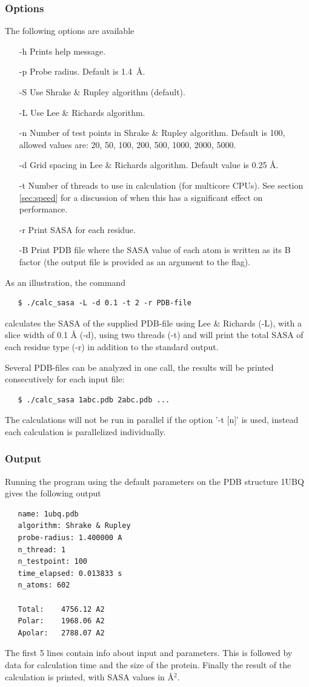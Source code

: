 \documentclass[a4paper,11pt]{article}
\begin{document}
\subsubsection{Options}
The following options are available
\begin{itemize}
  \item[-h] Prints help message.
  \item[-p] Probe radius. Default is 1.4~\AA.
  \item[-S] Use Shrake \& Rupley algorithm (default).
  \item[-L] Use Lee \& Richards algorithm.
  \item[-n] Number of test points in Shrake \& Rupley algorithm.
    Default is 100, allowed values are: 20, 50, 100, 200, 500, 1000,
    2000, 5000.
  \item[-d] Grid spacing in Lee \& Richards algorithm.
  Default value is 0.25 Å.
  \item[-t] Number of threads to use in calculation (for multicore
    CPUs). See section \ref{sec:speed} for a discussion of when this
    has a significant effect on performance.
  \item[-r] Print SASA for each residue.
  \item[-B] Print PDB file where the SASA value of each atom is
    written as its B factor (the output file is provided as an
    argument to the flag).
\end{itemize}
As an illustration, the command
\begin{verbatim}
   $ ./calc_sasa -L -d 0.1 -t 2 -r PDB-file
\end{verbatim}
calculates the SASA of the supplied PDB-file using Lee \& Richards (-L),
with a slice width of 0.1 Å (-d), using two threads (-t) and will print the
total SASA of each residue type (-r) in addition to the standard output.

Several PDB-files can be analyzed in one call, the results will be
printed consecutively for each input file:
\begin{verbatim}
   $ ./calc_sasa 1abc.pdb 2abc.pdb ...
\end{verbatim}
The calculations will not be run in parallel if the option '-t [n]' is
used, instead each calculation is parallelized individually.

\subsubsection{Output}
Running the program using the default parameters on the PDB structure
1UBQ gives the following output
\begin{verbatim}
   name: 1ubq.pdb
   algorithm: Shrake & Rupley
   probe-radius: 1.400000 A
   n_thread: 1
   n_testpoint: 100
   time_elapsed: 0.013833 s
   n_atoms: 602
   
   Total:    4756.12 A2
   Polar:    1968.06 A2
   Apolar:   2788.07 A2
\end{verbatim}
The first 5 lines contain info about input and parameters. This is
followed by data for calculation time and the size of the
protein. Finally the result of the calculation is printed, with SASA
values in Å$^2$.
\end{document}
